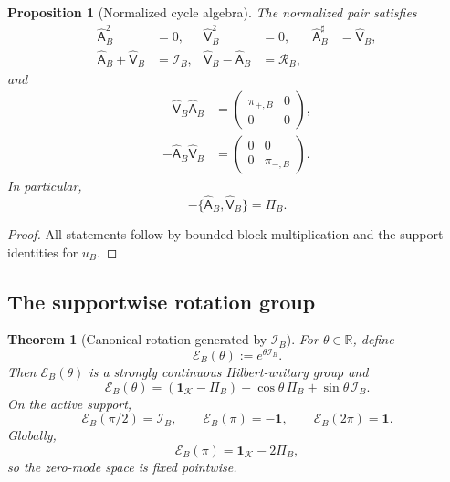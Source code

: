 \documentclass[11pt,reqno]{scrartcl}
\newcommand{\RR}{\mathbb R}
\newcommand{\scrK}{\mathscr K}
\newcommand{\idop}{\mathbf 1}
\newcommand{\Aop}{\mathsf A}
\newcommand{\Vop}{\mathsf V}
\theoremstyle{plain}
\newtheorem{theorem}{Theorem}[section]
\newtheorem{proposition}[proposition]{Proposition}
\theoremstyle{definition}
\theoremstyle{remark}
\begin{document}
\begin{proposition}[Normalized cycle algebra]
\label{prop:normalized-cycle}
The normalized pair satisfies
\begin{align}
  \widehat{\Aop}_B^2&=0,
  &\widehat{\Vop}_B^2&=0,
  &\widehat{\Aop}_B^\sharp&=\widehat{\Vop}_B,
  \label{eq:normalized-basic}\\
  \widehat{\Aop}_B+\widehat{\Vop}_B&=\mathcal I_B,
  &\widehat{\Vop}_B-\widehat{\Aop}_B&=\mathcal R_B,
  \label{eq:normalized-sums}
\end{align}
and
\begin{align}
  -\widehat{\Vop}_B\widehat{\Aop}_B
  &=\begin{pmatrix}\pi_{+,B}&0\\0&0\end{pmatrix},
  \label{eq:normalized-cycle-plus}\\
  -\widehat{\Aop}_B\widehat{\Vop}_B
  &=\begin{pmatrix}0&0\\0&\pi_{-,B}\end{pmatrix}.
  \label{eq:normalized-cycle-minus}
\end{align}
In particular,
\begin{equation}
  -\{\widehat{\Aop}_B,\widehat{\Vop}_B\}=\Pi_B.
  \label{eq:normalized-anticommutator}
\end{equation}
\end{proposition}

\begin{proof}
All statements follow by bounded block multiplication and the support
identities for \(u_B\).
\end{proof}

\subsection{The supportwise rotation group}

\begin{theorem}[Canonical rotation generated by \(\mathcal I_B\)]
\label{thm:rotation-group}
For \(\theta\in\RR\), define
\begin{equation}
  \mathscr E_B(\theta):=e^{\theta\mathcal I_B}.
\end{equation}
Then \(\mathscr E_B(\theta)\) is a strongly continuous Hilbert-unitary group
and
\begin{equation}
  \boxed{
  \mathscr E_B(\theta)
  =(\idop_{\scrK}-\Pi_B)
   +\cos\theta\,\Pi_B
   +\sin\theta\,\mathcal I_B.}
  \label{eq:rotation-exponential}
\end{equation}
On the active support,
\begin{equation}
  \mathscr E_B(\pi/2)=\mathcal I_B,
  \qquad
  \mathscr E_B(\pi)=-\idop,
  \qquad
  \mathscr E_B(2\pi)=\idop.
  \label{eq:quarter-turn}
\end{equation}
Globally,
\begin{equation}
  \mathscr E_B(\pi)=\idop_{\scrK}-2\Pi_B,
\end{equation}
so the zero-mode space is fixed pointwise.
\end{theorem}
\end{document}
